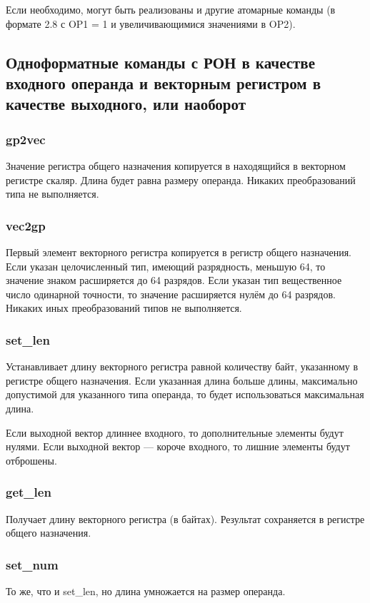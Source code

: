 \documentclass[forwardcom.tex]{subfiles}
\begin{document}
Если необходимо, могут быть реализованы и другие атомарные команды (в формате 2.8 с OP1 = 1 и увеличивающимися значениями в OP2).

\subsection{Одноформатные команды с РОН в качестве входного операнда и векторным регистром в качестве выходного, или наоборот}
\subsubsection{gp2vec}
Значение регистра общего назначения копируется в находящийся в векторном регистре скаляр. Длина будет равна размеру операнда. Никаких преобразований типа не выполняется.

\subsubsection{vec2gp}
Первый элемент векторного регистра копируется в регистр общего назначения. Если указан целочисленный тип, имеющий разрядность, меньшую 64, то значение знаком расширяется до 64 разрядов. Если указан тип \glqq вещественное число одинарной точности\grqq, то значение расширяется нулём до 64 разрядов. Никаких иных преобразований типов не выполняется.

\subsubsection{set\_len}
Устанавливает длину векторного регистра равной количеству байт, указанному в регистре общего назначения. Если указанная длина больше длины, максимально допустимой для указанного типа операнда, то будет использоваться максимальная длина.

Если выходной вектор длиннее входного, то дополнительные элементы будут нулями. Если выходной вектор --- короче входного, то лишние элементы будут отброшены.

\subsubsection{get\_len}
Получает длину векторного регистра (в байтах). Результат сохраняется в регистре общего назначения.

\subsubsection{set\_num}
То же, что и set\_len, но длина умножается на размер операнда.
\end{document}
